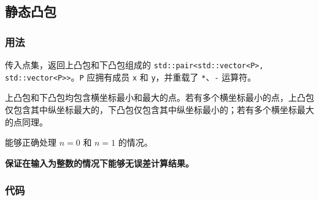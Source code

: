 \subsection{静态凸包}

\subsubsection{用法}

传入点集，返回上凸包和下凸包组成的 \lstinline{std::pair<std::vector<P>, std::vector<P>>}。\lstinline{P} 应拥有成员 \lstinline{x} 和 \lstinline{y}，并重载了 \lstinline{*}、\lstinline{-} 运算符。

上凸包和下凸包均包含横坐标最小和最大的点。若有多个横坐标最小的点，上凸包仅包含其中纵坐标最大的，下凸包仅包含其中纵坐标最小的；若有多个横坐标最大的点同理。

能够正确处理 $n = 0$ 和 $n = 1$ 的情况。

\textbf{保证在输入为整数的情况下能够无误差计算结果。}

\subsubsection{代码}


